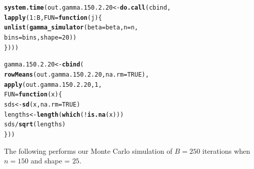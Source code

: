 \documentclass[11pt]{article}\usepackage[]{graphicx}\usepackage[]{color}
\makeatletter
\newcommand{\hlnum}[1]{\textcolor[rgb]{0.686,0.059,0.569}{#1}}%
\newcommand{\hlopt}[1]{\textcolor[rgb]{0,0,0}{#1}}%
\newcommand{\hlstd}[1]{\textcolor[rgb]{0.345,0.345,0.345}{#1}}%
\newcommand{\hlkwa}[1]{\textcolor[rgb]{0.161,0.373,0.58}{\textbf{#1}}}%
\newcommand{\hlkwb}[1]{\textcolor[rgb]{0.69,0.353,0.396}{#1}}%
\newcommand{\hlkwc}[1]{\textcolor[rgb]{0.333,0.667,0.333}{#1}}%
\newcommand{\hlkwd}[1]{\textcolor[rgb]{0.737,0.353,0.396}{\textbf{#1}}}%
\newenvironment{kframe}{%
 \def\at@end@of@kframe{}%
 \ifinner\ifhmode%
  \def\at@end@of@kframe{\end{minipage}}%
  \begin{minipage}{\columnwidth}%
 \fi\fi%
 \def\FrameCommand##1{\hskip\@totalleftmargin \hskip-\fboxsep
 \colorbox{shadecolor}{##1}\hskip-\fboxsep
     \hskip-\linewidth \hskip-\@totalleftmargin \hskip\columnwidth}%
 \MakeFramed {\advance\hsize-\width
   \@totalleftmargin\z@ \linewidth\hsize
   \@setminipage}}%
 {\par\unskip\endMakeFramed%
 \at@end@of@kframe}
\newenvironment{knitrout}{}{} %
\makeatother
\begin{document}
\begin{knitrout}
\color{fgcolor}\begin{kframe}
\begin{alltt}
\hlkwd{system.time}\hlstd{(out.gamma.150.2.20} \hlkwb{<-} \hlkwd{do.call}\hlstd{(cbind,}
  \hlkwd{lapply}\hlstd{(}\hlnum{1}\hlopt{:}\hlstd{B,} \hlkwc{FUN} \hlstd{=} \hlkwa{function}\hlstd{(}\hlkwc{j}\hlstd{)\{}
    \hlkwd{unlist}\hlstd{(}\hlkwd{gamma_simulator}\hlstd{(}\hlkwc{beta} \hlstd{= beta,} \hlkwc{n} \hlstd{= n,}
      \hlkwc{bins} \hlstd{= bins,} \hlkwc{shape} \hlstd{=} \hlnum{20}\hlstd{))}
\hlstd{\})))}
\end{alltt}


{\ttfamily\noindent\bfseries\color{errorcolor}{\#\# Error in eval(family\$initialize): non-positive values not allowed for the 'gamma' family}}

{\ttfamily\noindent\itshape\color{messagecolor}{\#\# Timing stopped at: 0.002 0 0.002}}\end{kframe}
\end{knitrout}

\begin{knitrout}
\color{fgcolor}\begin{kframe}
\begin{alltt}
\hlstd{gamma.150.2.20} \hlkwb{<-} \hlkwd{cbind}\hlstd{(}
  \hlkwd{rowMeans}\hlstd{(out.gamma.150.2.20,} \hlkwc{na.rm} \hlstd{=} \hlnum{TRUE}\hlstd{),}
  \hlkwd{apply}\hlstd{(out.gamma.150.2.20,} \hlnum{1}\hlstd{,}
  \hlkwc{FUN} \hlstd{=} \hlkwa{function}\hlstd{(}\hlkwc{x}\hlstd{)\{}
    \hlstd{sds} \hlkwb{<-} \hlkwd{sd}\hlstd{(x,} \hlkwc{na.rm} \hlstd{=} \hlnum{TRUE}\hlstd{)}
    \hlstd{lengths} \hlkwb{<-} \hlkwd{length}\hlstd{(}\hlkwd{which}\hlstd{(}\hlopt{!}\hlkwd{is.na}\hlstd{(x)))}
    \hlstd{sds} \hlopt{/} \hlkwd{sqrt}\hlstd{(lengths)}
  \hlstd{\}))}
\end{alltt}


{\ttfamily\noindent\bfseries\color{errorcolor}{\#\# Error in is.data.frame(x): object 'out.gamma.150.2.20' not found}}\end{kframe}
\end{knitrout}

The following performs our Monte Carlo simulation of $B = 250$ iterations 
when $n = 150$ and shape = $25$.
\end{document}
